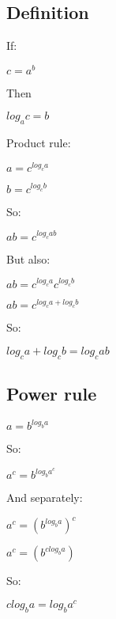 \subsection{Definition}

If:

\(c=a^b\)

Then

\(log_ac=b\)

Product rule:

\(a=c^{log_ca }\)

\(b=c^{log_cb }\)

So:

\(ab=c^{log_cab }\)

But also:

\(ab=c^{log_ca }c^{log_cb }\)

\(ab=c^{log_ca + log_cb }\)

So:

\(log_ca+log_cb=log_cab\)

\subsection{Power rule}

\(a=b^{log_ba}\)

So:

\(a^c=b^{log_ba^c}\)

And separately:

\(a^c=(b^{log_ba})^c\)

\(a^c=(b^{clog_ba})\)

So:

\(clog_ba=log_ba^c\)



